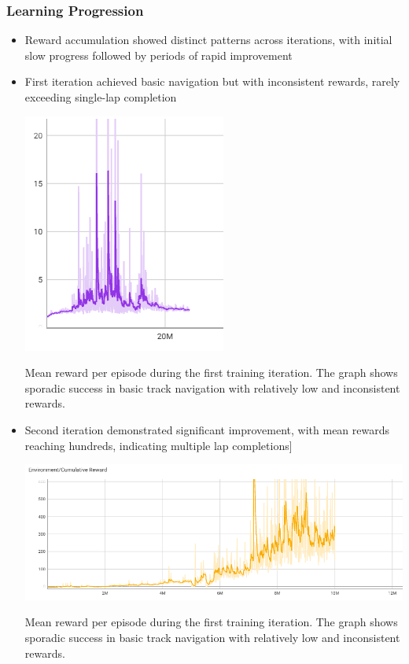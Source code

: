 \documentclass[10pt,twocolumn]{article}
\begin{document}
\subsubsection{Learning Progression}
\begin{itemize}
\item Reward accumulation showed distinct patterns across iterations, with initial slow progress followed by periods of rapid improvement
\item First iteration achieved basic navigation but with inconsistent rewards, rarely exceeding single-lap completion

\includegraphics[scale=.75]{run1}
\caption{Mean reward per episode during the first training iteration. The graph shows sporadic success in basic track navigation with relatively low and inconsistent rewards.}
\label{fig:run1-mean-reward}

\item Second iteration demonstrated significant improvement, with mean rewards reaching hundreds, indicating multiple lap completions]


\includegraphics[scale=.4]{run2}
\caption{Mean reward per episode during the first training iteration. The graph shows sporadic success in basic track navigation with relatively low and inconsistent rewards.}
\label{fig:run2-mean-reward}


\end{itemize}
\end{document}
